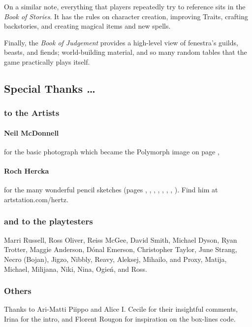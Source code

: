 \begin{multicols}{2}
On a similar note, everything that players repeatedly try to reference sits in the \textit{Book of Stories}.
It has the rules on character creation, improving Traits, crafting backstories, and creating magical items and new spells.

Finally, the \textit{Book of Judgement} provides a high-level view of \gls{fenestra}'s guilds, beasts, and fiends; world-building material, and so many random tables that the game practically plays itself.

\subsection*{Special Thanks \ldots}

\subsubsection*{to the Artists}

\paragraph{Neil McDonnell} for the basic photograph which became the Polymorph image on page \pageref{Roch_Hercka/polymorph},

\paragraph{Roch Hercka} for the many wonderful pencil sketches (pages 
\pageref{Roch_Hercka/dwarf_encumbrance}, 
\pageref{Roch_Hercka/cave_fight}, 
\pageref{Roch_Hercka/stances}, 
\pageref{Roch_Hercka/vitals_shot}, 
\pageref{Roch_Hercka/conjuration_right}, 
\pageref{Roch_Hercka/polymorph}, 
\pageref{Roch_Hercka/dwarvish_runes}, 
\pageref{Roch_Hercka/flashing_light}).
Find him at artstation.com/hertz.

\subsubsection*{and to the playtesters} Marri Russell, Ross Oliver, Reiss McGee, David Smith, Michael Dyson, Ryan Trotter, Maggie Anderson, 
D\'{o}nal Emerson, Christopher Taylor, June Strang, 
Necro (Bojan), Jigzo, Nibbly, Reavy, 
Aleksej, Mihailo, and Proxy,
Matija, Michael, Milijana, Niki, Nina, Ogie\'n,
and Ross.

\subsubsection*{Others}
Thanks to Ari-Matti Piippo and Alice I. Cecile for their insightful comments,
Irina for the intro,
and Florent Rougon for inspiration on the box-lines code.


\end{multicols}
